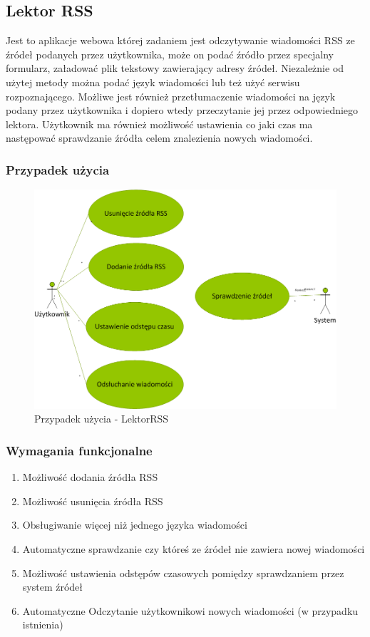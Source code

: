 \subsection{Lektor RSS}
Jest to aplikacje webowa której zadaniem jest odczytywanie wiadomości RSS ze źródeł podanych przez użytkownika, może on podać źródło przez specjalny formularz, załadować plik tekstowy zawierający adresy źródeł. Niezależnie od użytej metody można podać język wiadomości lub też użyć serwisu rozpoznającego. Możliwe jest również przetłumaczenie wiadomości na język podany przez użytkownika i dopiero wtedy przeczytanie jej przez odpowiedniego lektora. Użytkownik ma również możliwość ustawienia co jaki czas ma następować sprawdzanie źródła celem znalezienia nowych wiadomości.	 
\newpage
\subsubsection{Przypadek użycia}
\begin{figure}[!h]
	\centering
	\includegraphics[scale=0.45]{useCaseRSS.png} 
	\caption{Przypadek użycia - LektorRSS}
\end{figure}

\subsubsection{Wymagania funkcjonalne}
\begin{enumerate}
	\item Możliwość dodania źródła RSS
	\item Możliwość usunięcia źródła RSS
	\item Obsługiwanie więcej niż jednego języka wiadomości
	\item Automatyczne sprawdzanie czy któreś ze źródeł nie zawiera nowej wiadomości
	\item Możliwość ustawienia odstępów czasowych pomiędzy sprawdzaniem przez system źródeł
	\item Automatyczne Odczytanie użytkownikowi nowych wiadomości (w przypadku istnienia) 
\end{enumerate}  
